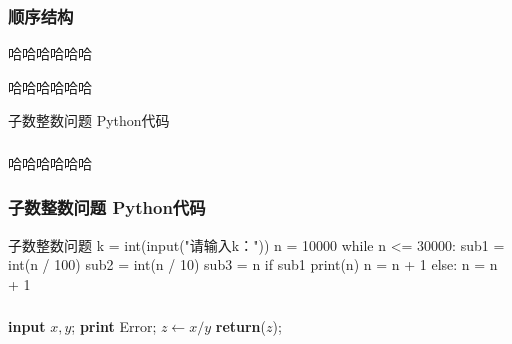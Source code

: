 \documentclass[dvipsnames, svgnames, x11names]{beamer}
\begin{document}
\begin{frame}
    \frametitle{顺序结构}
    \begin{tbox}哈哈哈哈哈哈
    \end{tbox}

        
            \begin{example}
                哈哈哈哈哈哈
            \end{example}

            \begin{tcolorbox}[title=\textbf{Lemma},colback=SeaGreen!10!CornflowerBlue!10,colframe=RoyalPurple!55!Aquamarine!100!] 子数整数问题 Python代码
            \end{tcolorbox}

            
  \end{frame}

  \begin{frame}
      \frametitle{}
      \begin{block}{}
        哈哈哈哈哈哈
    \end{block}
  \end{frame}

  \begin{frame}[fragile]
    \frametitle{子数整数问题 Python代码}
\begin{codeblock}{子数整数问题}
  k = int(input("请输入k："))
  n = 10000
  while n <= 30000:
      sub1 = int(n / 100)
      sub2 = int(n / 10) %
      sub3 = n %
      if sub1 %
          print(n)
          n = n + 1
      else:
          n = n + 1
\end{codeblock}
\end{frame}

\begin{frame}[fragile]
    \frametitle{}
    \begin{algorithm}[H]  
      \caption{Calculate $y = x/y$}
    \begin{algorithmic}[1]
      \Begin
      \State \textbf{input} $x,y$;
      \State \textbf{print} Error;
      \Else
      \State $z \gets x/y$
      \State \textbf{return}($z$);
      \End
      \end{algorithmic}
      \end{algorithm}
\end{frame}
\end{document}
